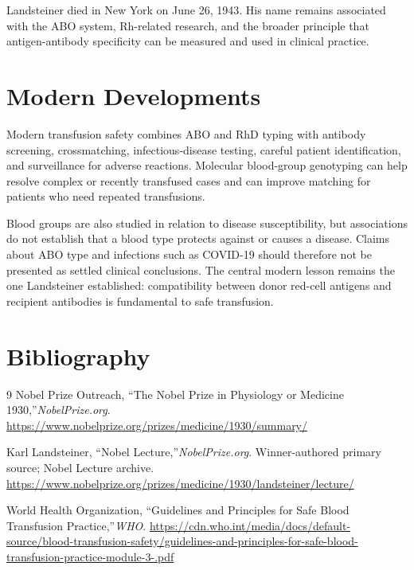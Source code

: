 Landsteiner died in New York on June 26, 1943. His name remains associated with the ABO system, Rh-related research, and the broader principle that antigen-antibody specificity can be measured and used in clinical practice.

\section{Modern Developments}

Modern transfusion safety combines ABO and RhD typing with antibody screening, crossmatching, infectious-disease testing, careful patient identification, and surveillance for adverse reactions. Molecular blood-group genotyping can help resolve complex or recently transfused cases and can improve matching for patients who need repeated transfusions.

Blood groups are also studied in relation to disease susceptibility, but associations do not establish that a blood type protects against or causes a disease. Claims about ABO type and infections such as COVID-19 should therefore not be presented as settled clinical conclusions. The central modern lesson remains the one Landsteiner established: compatibility between donor red-cell antigens and recipient antibodies is fundamental to safe transfusion.

\section{Bibliography}

\begin{thebibliography}{9}
Nobel Prize Outreach, ``The Nobel Prize in Physiology or Medicine 1930,''\emph{NobelPrize.org}.\newline
\url{https://www.nobelprize.org/prizes/medicine/1930/summary/}

Karl Landsteiner, ``Nobel Lecture,''\emph{NobelPrize.org}. Winner-authored primary source; Nobel Lecture archive.\newline
\url{https://www.nobelprize.org/prizes/medicine/1930/landsteiner/lecture/}

World Health Organization, ``Guidelines and Principles for Safe Blood Transfusion Practice,''\emph{WHO}.\newline
\url{https://cdn.who.int/media/docs/default-source/blood-transfusion-safety/guidelines-and-principles-for-safe-blood-transfusion-practice-module-3-.pdf}
\end{thebibliography}
